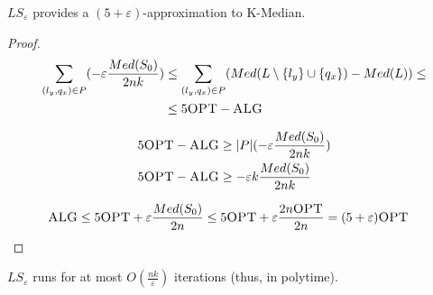     

    \begin{theorem}
        $LS_\varepsilon$ provides a $(5+\varepsilon)$-approximation to K-Median.
    \end{theorem}

    \begin{proof}
        \begin{equation*}
            \begin{split}
                \sum_{(l_y,q_x) \in P} (-\varepsilon \frac{Med(S_0)}{2 n k}) &\leq \sum_{(l_y, q_x) \in P} (Med(L \setminus \{l_y\} \cup \{q_x\}) - Med(L)) \leq\\
                    & \leq 5 \textsc{OPT} - \textsc{ALG}
            \end{split}
        \end{equation*}

        \begin{equation*}
            \begin{split}
                &5 \textsc{OPT} - \textsc{ALG} \geq \vert P \vert (- \varepsilon \frac{Med(S_0)}{2 n k})\\
                &5 \textsc{OPT} - \textsc{ALG} \geq - \varepsilon k \frac{Med(S_0)}{2 n k}
            \end{split}
        \end{equation*}

        \begin{equation*}
            \begin{split}
                \textsc{ALG} &\leq 5 \textsc{OPT} + \varepsilon \frac{Med(S_0)}{2n} \leq 5 \textsc{OPT} + \varepsilon \frac{2 n \textsc{OPT}}{2 n} = (5 + \varepsilon) \textsc{OPT}
            \end{split}
        \end{equation*}
    \end{proof}

    \begin{theorem}
        $LS_\varepsilon$ runs for at most $O(\frac{n k}{\varepsilon})$ iterations (thus, in polytime).
    \end{theorem}


